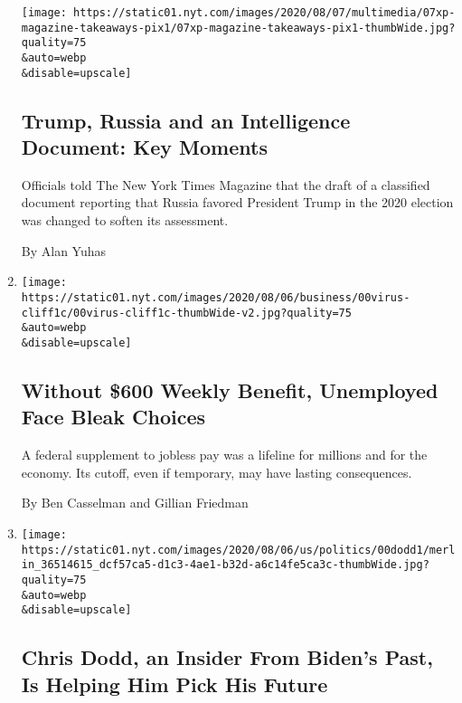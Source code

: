 \begin{enumerate}
  \texttt{[image: https://static01.nyt.com/images/2020/08/07/multimedia/07xp-magazine-takeaways-pix1/07xp-magazine-takeaways-pix1-thumbWide.jpg?quality=75\\\&auto=webp\\\&disable=upscale]}

  \hypertarget{trump-russia-and-an-intelligence-document-key-moments}{%
  \subsection{Trump, Russia and an Intelligence Document: Key
  Moments}\label{trump-russia-and-an-intelligence-document-key-moments}}

  Officials told The New York Times Magazine that the draft of a
  classified document reporting that Russia favored President Trump in
  the 2020 election was changed to soften its assessment.

  By Alan Yuhas
\item
  \href{/2020/08/08/business/economy/lost-unemployment-benefits.html}{}

  \texttt{[image: https://static01.nyt.com/images/2020/08/06/business/00virus-cliff1c/00virus-cliff1c-thumbWide-v2.jpg?quality=75\\\&auto=webp\\\&disable=upscale]}

  \hypertarget{without-600-weekly-benefit-unemployed-face-bleak-choices}{%
  \subsection{Without \$600 Weekly Benefit, Unemployed Face Bleak
  Choices}\label{without-600-weekly-benefit-unemployed-face-bleak-choices}}

  A federal supplement to jobless pay was a lifeline for millions and
  for the economy. Its cutoff, even if temporary, may have lasting
  consequences.

  By Ben Casselman and Gillian Friedman
\item
  \href{/2020/08/08/us/politics/biden-vp-chris-dodd.html}{}

  \texttt{[image: https://static01.nyt.com/images/2020/08/06/us/politics/00dodd1/merlin\_36514615\_dcf57ca5-d1c3-4ae1-b32d-a6c14fe5ca3c-thumbWide.jpg?quality=75\\\&auto=webp\\\&disable=upscale]}

  \hypertarget{chris-dodd-an-insider-from-bidens-past-is-helping-him-pick-his-future}{%
  \subsection{Chris Dodd, an Insider From Biden's Past, Is Helping Him
  Pick His
  Future}\label{chris-dodd-an-insider-from-bidens-past-is-helping-him-pick-his-future}}


\end{enumerate}
